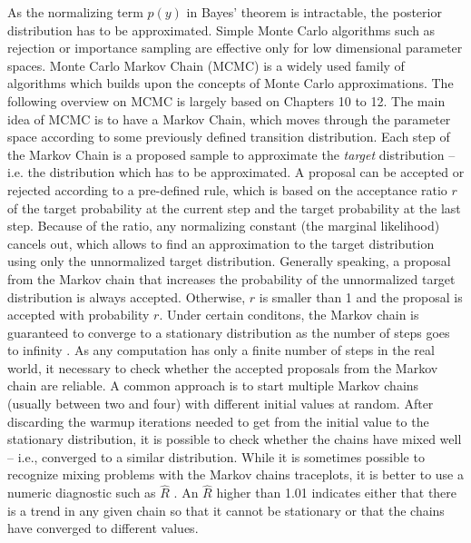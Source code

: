 As the normalizing term $p(y)$ in Bayes' theorem is intractable, the posterior distribution has to be approximated.
Simple Monte Carlo algorithms such as rejection or importance sampling are effective only for low dimensional parameter spaces.
Monte Carlo Markov Chain (MCMC) is a widely used family of algorithms which builds upon the concepts of Monte Carlo approximations.
The following overview on MCMC is largely based on \cite{gelman_bayesian_2014} Chapters 10 to 12.
The main idea of MCMC is to have a Markov Chain, which moves through the parameter space according to some previously defined transition distribution.
Each step of the Markov Chain is a proposed sample to approximate the \textit{target} distribution – i.e. the distribution which has to be approximated.
A proposal can be accepted or rejected according to a pre-defined rule, which is based on the acceptance ratio $r$ of the target probability at the current step and the target probability at the last step.
Because of the ratio, any normalizing constant (the marginal likelihood) cancels out, which allows to find an approximation to the target distribution using only the unnormalized target distribution.
Generally speaking, a proposal from the Markov chain that increases the probability of the unnormalized target distribution is always accepted.
Otherwise, $r$ is smaller than 1 and the proposal is accepted with probability $r$.
Under certain conditons, the Markov chain is guaranteed to converge to a stationary distribution as the number of steps goes to infinity \citep[Chapter 11]{gelman_bayesian_2014}.
As any computation has only a finite number of steps in the real world, it necessary to check whether the accepted proposals from the Markov chain are reliable.
A common approach is to start multiple Markov chains (usually between two and four) with different initial values at random.
After discarding the warmup iterations needed to get from the initial value to the stationary distribution, it is possible to check whether the chains have mixed well – i.e., converged to a similar distribution.
While it is sometimes possible to recognize mixing problems with the Markov chains traceplots, it is better to use a numeric diagnostic such as $\hat R$ \citep{vehtari_rank-normalization_2021}.
An $\hat R$ higher than 1.01 indicates either that there is a trend in any given chain so that it cannot be stationary or that the chains have converged to different values.

